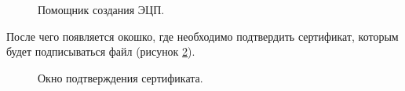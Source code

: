 \documentclass[10pt,a4paper]{report}
\begin{document}
\begin{figure}[h]
	\caption{Помощник создания ЭЦП.}
	\label{ris:step32}
\end{figure}

После чего появляется окошко, где необходимо подтвердить сертификат, которым будет подписываться файл (рисунок \ref{ris:step33}).

\begin{figure}[h]
	\caption{Окно подтверждения сертификата.}
	\label{ris:step33}
\end{figure}
\end{document}
